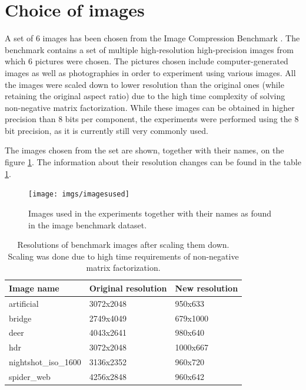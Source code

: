 \documentclass[thesis=M,english]{FITthesis}[2012/10/20]
\begin{document}
\section{Choice of images}
A set of 6 images has been chosen from the Image Compression Benchmark \cite{imgcomprbenchmark}.
The benchmark contains a set of multiple high-resolution high-precision images from which 6
pictures were chosen. The pictures chosen include computer-generated images as well as photographies
in order to experiment using various images. All the images were scaled down to lower resolution than
the original ones (while retaining the original aspect ratio) due to the high time complexity
of solving non-negative matrix factorization. While these images can be obtained in higher
precision than 8 bits per component, the experiments were performed using the 8 bit precision,
as it is currently still very commonly used.

The images chosen from the set are shown, together with their names, on the
figure \ref{fig:benchmarkimages}. The information about their resolution changes
can be found in the table \ref{tab:benchmarkimagesresolutions}.

\begin{figure}[h]
  \centering
  \texttt{[image: imgs/imagesused]}
  \caption[Benchmark images]{Images used in the experiments together with their names as found in the
           image benchmark dataset.}
  \label{fig:benchmarkimages}
\end{figure}

\begin{table}[h]
\centering
\begin{tabular}{|l|l|l|}
\hline
\textbf{Image name}  & \textbf{Original resolution} & \textbf{New resolution} \\ \hline
artificial           & 3072x2048                    & 950x633                     \\ \hline
bridge               & 2749x4049                    & 679x1000                     \\ \hline
deer                 & 4043x2641                    & 980x640                     \\ \hline
hdr                  & 3072x2048                    & 1000x667                     \\ \hline
nightshot\_iso\_1600 & 3136x2352                    & 960x720                     \\ \hline
spider\_web          & 4256x2848                    & 960x642                     \\ \hline
\end{tabular}
\caption[Resolutions of downscaled benchmark images]{Resolutions of benchmark images after scaling them down. Scaling was done
		due to high time requirements of non-negative matrix factorization.}
\label{tab:benchmarkimagesresolutions}
\end{table}
\end{document}
